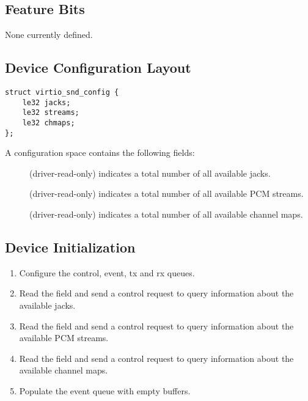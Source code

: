 \subsection{Feature Bits}\label{sec:Device Types / Sound Device / Feature Bits}

None currently defined.

\subsection{Device Configuration Layout}\label{sec:Device Types / Sound Device / Device Configuration Layout}

\begin{lstlisting}
struct virtio_snd_config {
    le32 jacks;
    le32 streams;
    le32 chmaps;
};
\end{lstlisting}

A configuration space contains the following fields:

\begin{description}
\item[] (driver-read-only) indicates a total number of all available
jacks.
\item[] (driver-read-only) indicates a total number of all available
PCM streams.
\item[] (driver-read-only) indicates a total number of all available
channel maps.
\end{description}

\subsection{Device Initialization}

\begin{enumerate}
\item Configure the control, event, tx and rx queues.
\item Read the  field and send a control request to query information
about the available jacks.
\item Read the  field and send a control request to query information
about the available PCM streams.
\item Read the  field and send a control request to query information
about the available channel maps.
\item Populate the event queue with empty buffers.
\end{enumerate}



